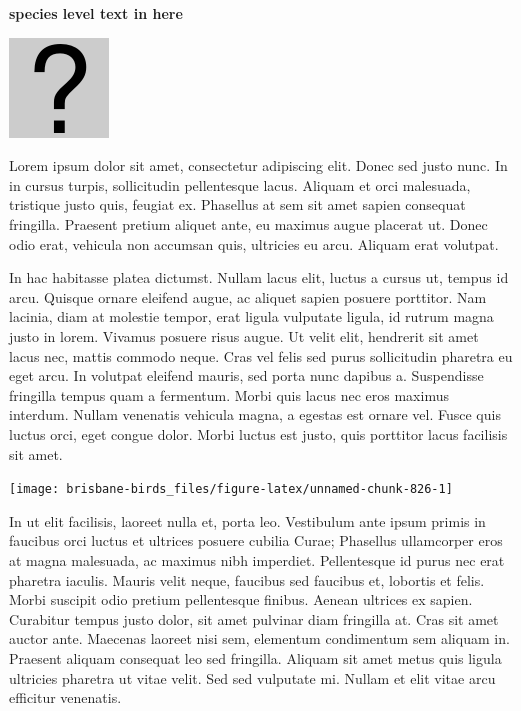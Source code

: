 \documentclass[]{book}
\let\origfigure\figure
\let\endorigfigure\endfigure
\renewenvironment{figure}[1][2] {
  \expandafter\origfigure\expandafter[H]
} {
  \endorigfigure
}
\begin{document}
\textbf{species level text in here}

\begin{figure}
\centering
\includegraphics{assets/missing.png}
\caption{No image for species}
\end{figure}

Lorem ipsum dolor sit amet, consectetur adipiscing elit. Donec sed justo
nunc. In in cursus turpis, sollicitudin pellentesque lacus. Aliquam et
orci malesuada, tristique justo quis, feugiat ex. Phasellus at sem sit
amet sapien consequat fringilla. Praesent pretium aliquet ante, eu
maximus augue placerat ut. Donec odio erat, vehicula non accumsan quis,
ultricies eu arcu. Aliquam erat volutpat.

In hac habitasse platea dictumst. Nullam lacus elit, luctus a cursus ut,
tempus id arcu. Quisque ornare eleifend augue, ac aliquet sapien posuere
porttitor. Nam lacinia, diam at molestie tempor, erat ligula vulputate
ligula, id rutrum magna justo in lorem. Vivamus posuere risus augue. Ut
velit elit, hendrerit sit amet lacus nec, mattis commodo neque. Cras vel
felis sed purus sollicitudin pharetra eu eget arcu. In volutpat eleifend
mauris, sed porta nunc dapibus a. Suspendisse fringilla tempus quam a
fermentum. Morbi quis lacus nec eros maximus interdum. Nullam venenatis
vehicula magna, a egestas est ornare vel. Fusce quis luctus orci, eget
congue dolor. Morbi luctus est justo, quis porttitor lacus facilisis sit
amet.

\begin{figure}
\texttt{[image: brisbane-birds\_files/figure-latex/unnamed-chunk-826-1]} \caption{insert figure caption}\label{fig:unnamed-chunk-826}
\end{figure}

In ut elit facilisis, laoreet nulla et, porta leo. Vestibulum ante ipsum
primis in faucibus orci luctus et ultrices posuere cubilia Curae;
Phasellus ullamcorper eros at magna malesuada, ac maximus nibh
imperdiet. Pellentesque id purus nec erat pharetra iaculis. Mauris velit
neque, faucibus sed faucibus et, lobortis et felis. Morbi suscipit odio
pretium pellentesque finibus. Aenean ultrices ex sapien. Curabitur
tempus justo dolor, sit amet pulvinar diam fringilla at. Cras sit amet
auctor ante. Maecenas laoreet nisi sem, elementum condimentum sem
aliquam in. Praesent aliquam consequat leo sed fringilla. Aliquam sit
amet metus quis ligula ultricies pharetra ut vitae velit. Sed sed
vulputate mi. Nullam et elit vitae arcu efficitur venenatis.
\end{document}
